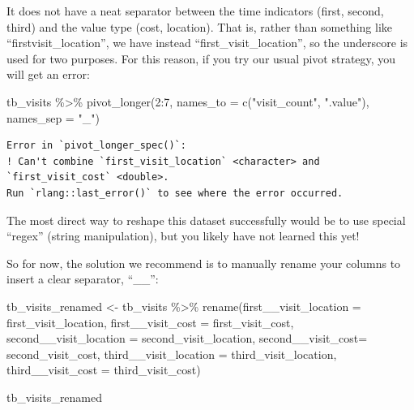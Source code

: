 \documentclass[
  letterpaper,
  DIV=11,
  numbers=noendperiod]{scrreprt}
\newenvironment{Shaded}{\begin{snugshade}}{\end{snugshade}}
\newcommand{\AttributeTok}[1]{\textcolor[rgb]{0.40,0.45,0.13}{#1}}
\newcommand{\DecValTok}[1]{\textcolor[rgb]{0.68,0.00,0.00}{#1}}
\newcommand{\FunctionTok}[1]{\textcolor[rgb]{0.28,0.35,0.67}{#1}}
\newcommand{\NormalTok}[1]{\textcolor[rgb]{0.00,0.23,0.31}{#1}}
\newcommand{\OtherTok}[1]{\textcolor[rgb]{0.00,0.23,0.31}{#1}}
\newcommand{\SpecialCharTok}[1]{\textcolor[rgb]{0.37,0.37,0.37}{#1}}
\newcommand{\StringTok}[1]{\textcolor[rgb]{0.13,0.47,0.30}{#1}}
\begin{document}
It does not have a neat separator between the time indicators (first,
second, third) and the value type (cost, location). That is, rather than
something like ``firstvisit\_location'', we have instead
``first\_visit\_location'', so the underscore is used for two purposes.
For this reason, if you try our usual pivot strategy, you will get an
error:

\begin{Shaded}
\begin{Highlighting}[]
\NormalTok{tb\_visits }\SpecialCharTok{\%\textgreater{}\%} 
  \FunctionTok{pivot\_longer}\NormalTok{(}\DecValTok{2}\SpecialCharTok{:}\DecValTok{7}\NormalTok{, }
               \AttributeTok{names\_to =} \FunctionTok{c}\NormalTok{(}\StringTok{"visit\_count"}\NormalTok{, }\StringTok{".value"}\NormalTok{), }
               \AttributeTok{names\_sep =} \StringTok{"\_"}\NormalTok{)}
\end{Highlighting}
\end{Shaded}

\begin{verbatim}
Error in `pivot_longer_spec()`:
! Can't combine `first_visit_location` <character> and `first_visit_cost` <double>.
Run `rlang::last_error()` to see where the error occurred.
\end{verbatim}

The most direct way to reshape this dataset successfully would be to use
special ``regex'' (string manipulation), but you likely have not learned
this yet!

So for now, the solution we recommend is to manually rename your columns
to insert a clear separator, ``\_\_'':

\begin{Shaded}
\begin{Highlighting}[]
\NormalTok{tb\_visits\_renamed }\OtherTok{\textless{}{-}} 
\NormalTok{  tb\_visits }\SpecialCharTok{\%\textgreater{}\%} 
  \FunctionTok{rename}\NormalTok{(}\AttributeTok{first\_\_visit\_location =}\NormalTok{ first\_visit\_location, }
         \AttributeTok{first\_\_visit\_cost =}\NormalTok{ first\_visit\_cost, }
         \AttributeTok{second\_\_visit\_location =}\NormalTok{ second\_visit\_location, }
         \AttributeTok{second\_\_visit\_cost=}\NormalTok{ second\_visit\_cost, }
         \AttributeTok{third\_\_visit\_location =}\NormalTok{ third\_visit\_location, }
         \AttributeTok{third\_\_visit\_cost =}\NormalTok{ third\_visit\_cost)}

\NormalTok{tb\_visits\_renamed}
\end{Highlighting}
\end{Shaded}
\end{document}
